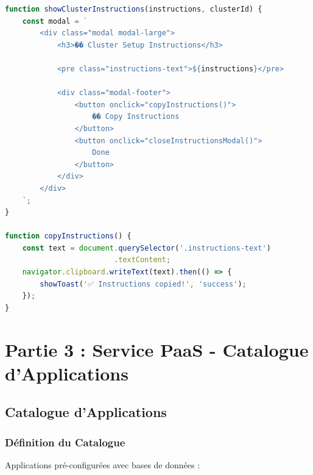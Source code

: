 \documentclass[12pt,a4paper]{article}
\begin{document}
\begin{lstlisting}[language=JavaScript,caption=Instructions cluster (swarm.js)]
function showClusterInstructions(instructions, clusterId) {
    const modal = `
        <div class="modal modal-large">
            <h3>�� Cluster Setup Instructions</h3>
            
            <pre class="instructions-text">${instructions}</pre>
            
            <div class="modal-footer">
                <button onclick="copyInstructions()">
                    �� Copy Instructions
                </button>
                <button onclick="closeInstructionsModal()">
                    Done
                </button>
            </div>
        </div>
    `;
}

function copyInstructions() {
    const text = document.querySelector('.instructions-text')
                         .textContent;
    navigator.clipboard.writeText(text).then(() => {
        showToast('✅ Instructions copied!', 'success');
    });
}
\end{lstlisting}

\section{Partie 3 : Service PaaS - Catalogue d'Applications}

\subsection{Catalogue d'Applications}

\subsubsection{Définition du Catalogue}

Applications pré-configurées avec bases de données :
\end{document}
